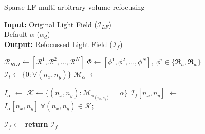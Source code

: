 \begin{algorithm}[!h]
\scriptsize
\caption{Sparse LF multi arbitrary-volume refocusing}\label{alg:sparse_LF_refocus}

\hspace*{\algorithmicindent} \textbf{Input:} Original Light Field ($\mathcal{I}_{LF}$) \\
\hspace*{\algorithmicindent} \hspace{.9cm} Default $\alpha$ ($\alpha_d$)\\ 
\hspace*{\algorithmicindent} \textbf{Output:} Refocussed Light Field ($\mathcal{I}_f$)

\begin{algorithmic}[1]

\State $\mathcal{R}_{ROI} \gets  [\mathcal{R}^1, \mathcal{R}^2, ..., \mathcal{R}^N]$
    \State $\Phi \gets [\phi^1, \phi^2, ..., \phi^N],~\phi^i \in \{\mathfrak{R}_{n}, \mathfrak{R}_{w}\}$
    \State $\mathcal{I}_t \gets \{0:\forall(n_x,n_y)\}$ 
    \State $\mathcal{M}_\alpha$ $\gets$ 

        \State $I_{\alpha}$ $\gets$  
        \State $\mathcal{K} \gets \{(n_x,n_y):\mathcal{M}_{{\alpha}_{(n_x,n_y)}}=\alpha\}$
        \State $\mathcal{I}_f[n_x,n_y]$ $\gets$ $I_{\alpha}[n_x,n_y] \;\forall(n_x,n_y)\in\mathcal{K}$;

    \EndFor
    \State $\mathcal{I}_f \gets$ 
    \State \textbf{return} $\mathcal{I}_f$
\EndProcedure




\end{algorithmic}
\end{algorithm}
